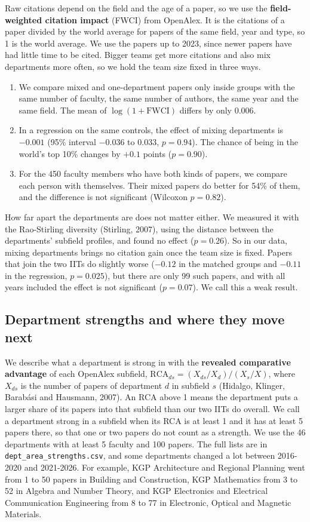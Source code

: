 \documentclass[conference,10pt]{IEEEtran}
\begin{document}
Raw citations depend on the field and the age of a paper, so we use the \textbf{field-weighted citation impact}
(FWCI) from OpenAlex. It is the citations of a paper divided by the world average for papers of the same field, year
and type, so 1 is the world average. We use the papers up to 2023, since newer papers have had little time to be cited.
Bigger teams get more citations and also mix departments more often, so we hold the team size fixed in three ways.
\begin{enumerate}
\item We compare mixed and one-department papers only inside groups with the same number of faculty, the same number of
authors, the same year and the same field. The mean of $\log(1 + \mathrm{FWCI})$ differs by only 0.006.
\item In a regression on the same controls, the effect of mixing departments is $-0.001$ (95\% interval $-0.036$ to
$0.033$, $p = 0.94$). The chance of being in the world's top 10\% changes by $+0.1$ points ($p = 0.90$).
\item For the 450 faculty members who have both kinds of papers, we compare each person with themselves. Their mixed
papers do better for 54\% of them, and the difference is not significant (Wilcoxon $p = 0.82$).
\end{enumerate}
How far apart the departments are does not matter either. We measured it with the Rao-Stirling diversity (Stirling,
2007), using the distance between the departments' subfield profiles, and found no effect ($p = 0.26$). So in our data,
mixing departments brings no citation gain once the team size is fixed. Papers that join the two IITs do slightly worse
($-0.12$ in the matched groups and $-0.11$ in the regression, $p = 0.025$), but there are only 99 such papers, and with
all years included the effect is not significant ($p = 0.07$). We call this a weak result.

\subsection{Department strengths and where they move next}
We describe what a department is strong in with the \textbf{revealed comparative advantage} of each OpenAlex subfield,
$\mathrm{RCA}_{ds} = (X_{ds}/X_d)/(X_s/X)$, where $X_{ds}$ is the number of papers of department $d$ in subfield $s$
(Hidalgo, Klinger, Barab\'asi and Hausmann, 2007). An RCA above 1 means the department puts a larger share of its papers
into that subfield than our two IITs do overall. We call a department strong in a subfield when its RCA is at least 1
and it has at least 5 papers there, so that one or two papers do not count as a strength. We use the 46 departments
with at least 5 faculty and 100 papers. The full lists are in \texttt{dept\_area\_strengths.csv}, and some departments
changed a lot between 2016-2020 and 2021-2026. For example, KGP Architecture and Regional Planning went from 1 to 50
papers in Building and Construction, KGP Mathematics from 3 to 52 in Algebra and Number Theory, and KGP Electronics and
Electrical Communication Engineering from 8 to 77 in Electronic, Optical and Magnetic Materials.
\end{document}

